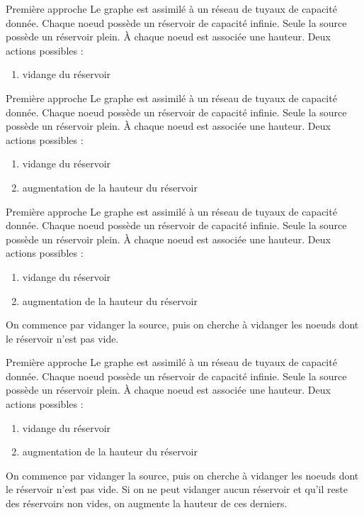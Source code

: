 \documentclass[hyperref={},
xcolor={dvipsnames,svgnames,table},10pt]{beamer}
\begin{document}
\begin{frame}{Première approche}
	Le graphe est assimilé à un réseau de tuyaux de capacité donnée.\vfill
	Chaque noeud possède un réservoir de capacité infinie.\vfill
	Seule la source possède un réservoir plein. \vfill
	À chaque noeud est associée une hauteur.\vfill
	Deux actions possibles : \begin{enumerate}
		\item vidange du réservoir
	\end{enumerate} \vfill
\end{frame}

\begin{frame}{Première approche}
	Le graphe est assimilé à un réseau de tuyaux de capacité donnée.\vfill
	Chaque noeud possède un réservoir de capacité infinie.\vfill
	Seule la source possède un réservoir plein. \vfill
	À chaque noeud est associée une hauteur.\vfill
	Deux actions possibles : \begin{enumerate}
		\item vidange du réservoir
		\item augmentation de la hauteur du réservoir
	\end{enumerate} \vfill
\end{frame}

\begin{frame}{Première approche}
	Le graphe est assimilé à un réseau de tuyaux de capacité donnée.\vfill
	Chaque noeud possède un réservoir de capacité infinie.\vfill
	Seule la source possède un réservoir plein. \vfill
	À chaque noeud est associée une hauteur.\vfill
	Deux actions possibles : \begin{enumerate}
		\item vidange du réservoir
		\item augmentation de la hauteur du réservoir
	\end{enumerate} \vfill
	On commence par vidanger la source, puis on cherche à vidanger les noeuds dont le réservoir n'est
	pas vide. \vfill
\end{frame}

\begin{frame}{Première approche}
	Le graphe est assimilé à un réseau de tuyaux de capacité donnée.\vfill
	Chaque noeud possède un réservoir de capacité infinie.\vfill
	Seule la source possède un réservoir plein. \vfill
	À chaque noeud est associée une hauteur.\vfill
	Deux actions possibles : \begin{enumerate}
		\item vidange du réservoir
		\item augmentation de la hauteur du réservoir
	\end{enumerate} \vfill
	On commence par vidanger la source, puis on cherche à vidanger les noeuds dont le réservoir n'est
	pas vide. \vfill
	Si on ne peut vidanger aucun réservoir et qu'il reste des réservoirs non vides, on augmente la
	hauteur de ces derniers. \vfill
\end{frame}
\end{document}
